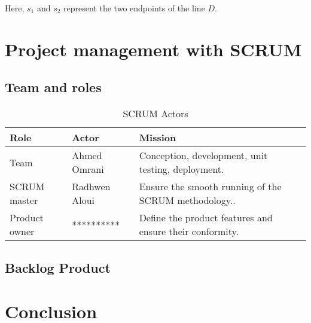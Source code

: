 Here, $s_1$ and $s_2$ represent the two endpoints of the line $D$.
\vspace{1em}
\section{Project management with SCRUM }
\subsection{Team and roles}
\begin{table}[!ht]
  \centering
  \begin{tabular}{|l|l|p{9cm}|}
    \hline
    Role & Actor & Mission \\
    \hline
    Team & Ahmed Omrani &Conception, development, unit testing, deployment. \\
    \hline
    SCRUM master & Radhwen Aloui &Ensure the smooth running of the SCRUM methodology.. \\
    \hline
    Product owner & ********** &Define the product features and ensure their conformity. \\
    \hline
  \end{tabular}
  \caption{SCRUM Actors}\label{ActScrum}
\end{table}
\subsection{Backlog Product}
\vspace{1em}
\section*{Conclusion}

\newpage

%




%